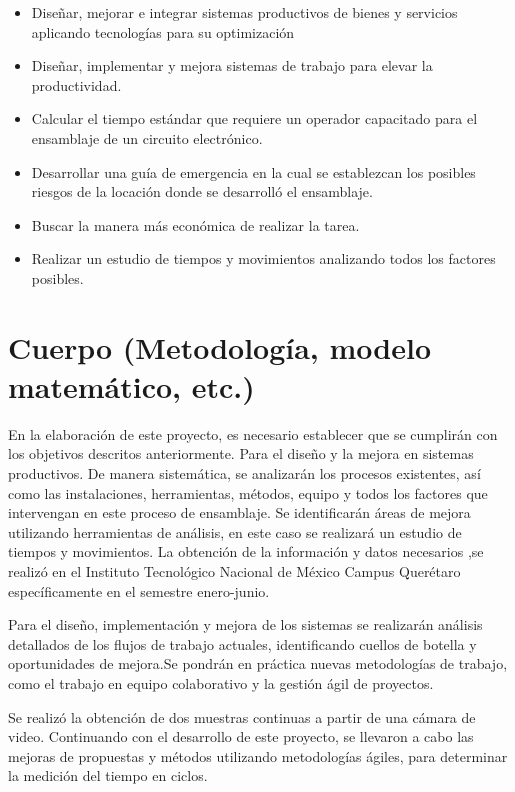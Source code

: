 \begin{itemize}
    \begin{itemize}
        \item Diseñar, mejorar e integrar sistemas productivos de bienes y servicios aplicando tecnologías para su optimización
        \item Diseñar, implementar y mejora sistemas de trabajo para elevar la productividad.
        \item Calcular el tiempo estándar que requiere un operador capacitado para el ensamblaje de un circuito electrónico.
        \item Desarrollar una guía de emergencia en la cual se establezcan los posibles riesgos de la locación donde se desarrolló el ensamblaje.
        \item Buscar la manera más económica de realizar la tarea.
        \item Realizar un estudio de tiempos y movimientos analizando todos los factores posibles.
    \end{itemize}
    
    
    \section{Cuerpo (Metodología, modelo matemático, etc.)}
    
    
    
    En la elaboración de este proyecto, es necesario establecer que se cumplirán con los objetivos descritos anteriormente. Para el diseño y la mejora en sistemas productivos. De manera sistemática, se analizarán los procesos existentes, así como las instalaciones, herramientas, métodos, equipo y todos los factores que intervengan en este proceso de ensamblaje. Se identificarán áreas de mejora utilizando herramientas de análisis, en este caso se realizará un estudio de tiempos y movimientos. La obtención de la información y datos necesarios ,se realizó en el Instituto Tecnológico Nacional de México Campus Querétaro específicamente en el semestre enero-junio.
    
   Para el diseño, implementación y mejora de los sistemas se realizarán análisis detallados de los flujos de trabajo actuales, identificando cuellos de botella y oportunidades de mejora.Se pondrán en práctica nuevas metodologías de trabajo, como el trabajo en equipo colaborativo y la gestión ágil de proyectos.
   
    Se realizó la obtención de dos muestras continuas a partir de una cámara de video.  Continuando con el desarrollo de este proyecto, se llevaron a cabo las mejoras de propuestas y métodos utilizando metodologías ágiles, para determinar la medición del tiempo en ciclos.
    

\end{itemize}
